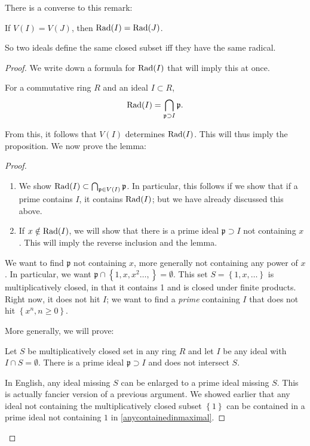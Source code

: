 There is a converse to this remark:
\begin{proposition} 
If $V(I) = V(J)$, then $\operatorname{Rad}(I) = \operatorname{Rad}(J)$. 
\end{proposition} 
So two ideals define the same closed subset iff they have the same radical.
\begin{proof} 
We write down a formula for $\operatorname{Rad}(I)$ that will imply this at once.
\begin{lemma} For a commutative ring $R$ and an ideal $I \subset R$, 
\[ \operatorname{Rad}(I) = \bigcap_{\mathfrak{p} \supset I} \mathfrak{p}.  \]
\end{lemma} 
From this, it follows that $V(I)$ determines $\operatorname{Rad}(I)$.  This will thus imply
the proposition.  
We now prove the lemma:
\begin{proof} 
\begin{enumerate}
\item We show $\operatorname{Rad}(I) \subset \bigcap_{\mathfrak{p} \in V(I)} \mathfrak{p} $.  In
particular, this follows if we show that if a prime contains $I$, it contains $\operatorname{Rad}(I)$; but we have already
discussed this above.  
\item If $x \notin \operatorname{Rad}(I)$, we will show that there is a prime ideal $\mathfrak{p}
\supset I$ not containing $x$. This will imply the reverse inclusion and the
lemma.  
\end{enumerate}


We want to find $\mathfrak{p}$ not containing $x$, more generally not
containing any power of $x$.  In particular, we want $\mathfrak{p} \cap \left\{1,
x, x^2 \dots, \right\} = \emptyset$.  This set $S = \left\{1, x, \dots\right\}$
is multiplicatively closed, in that it contains 1 and is closed under
finite products. Right now, it does not hit $I$; we want to find a
\emph{prime} containing $I$ that does not hit $\left\{x^n, n \geq 0\right\}$.


More generally, we will prove:

\begin{sublemma}
Let $S$ be multiplicatively closed set in any ring $R$ and let $I$ be any ideal with $I \cap S  =
\emptyset$.  There is a prime ideal $\mathfrak{p} \supset I$ and does not
intersect $S$.  
\end{sublemma}
In English, any ideal missing $S$ can be enlarged to a prime ideal missing $S$.
This is actually fancier version of a previous argument. We showed earlier that any ideal not
containing the multiplicatively closed subset $\left\{1\right\}$ can be
contained in a prime ideal not containing $1$ in \ref{anycontainedinmaximal}.


\end{proof}
\end{proof}

